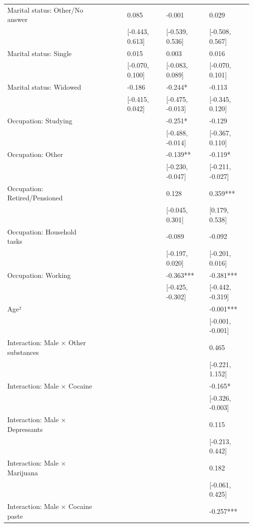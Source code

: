 \documentclass[
  spanish,
  10pt,
]{article}
\begin{document}
\begin{table}[H]
{\begin{tabular}[t]{llllllll}
Marital status: Other/No answer &  &  &  &  & 0.085 & -0.001 & 0.029\\
 &  &  &  &  & {}[-0.443, 0.613] & {}[-0.539, 0.536] & {}[-0.508, 0.567]\\
Marital status: Single &  &  &  &  & 0.015 & 0.003 & 0.016\\
 &  &  &  &  & {}[-0.070, 0.100] & {}[-0.083, 0.089] & {}[-0.070, 0.101]\\
Marital status: Widowed &  &  &  &  & -0.186 & -0.244* & -0.113\\
 &  &  &  &  & {}[-0.415, 0.042] & {}[-0.475, -0.013] & {}[-0.345, 0.120]\\
Occupation: Studying &  &  &  &  &  & -0.251* & -0.129\\
 &  &  &  &  &  & {}[-0.488, -0.014] & {}[-0.367, 0.110]\\
Occupation: Other &  &  &  &  &  & -0.139** & -0.119*\\
 &  &  &  &  &  & {}[-0.230, -0.047] & {}[-0.211, -0.027]\\
Occupation: Retired/Pensioned &  &  &  &  &  & 0.128 & 0.359***\\
 &  &  &  &  &  & {}[-0.045, 0.301] & {}[0.179, 0.538]\\
Occupation: Household tasks &  &  &  &  &  & -0.089 & -0.092\\
 &  &  &  &  &  & {}[-0.197, 0.020] & {}[-0.201, 0.016]\\
Occupation: Working &  &  &  &  &  & -0.363*** & -0.381***\\
 &  &  &  &  &  & {}[-0.425, -0.302] & {}[-0.442, -0.319]\\
Age² &  &  &  &  &  &  & -0.001***\\
 &  &  &  &  &  &  & {}[-0.001, -0.001]\\
Interaction: Male × Other substances &  &  &  &  &  &  & 0.465\\
 &  &  &  &  &  &  & {}[-0.221, 1.152]\\
Interaction: Male × Cocaine &  &  &  &  &  &  & -0.165*\\
 &  &  &  &  &  &  & {}[-0.326, -0.003]\\
Interaction: Male × Depressants &  &  &  &  &  &  & 0.115\\
 &  &  &  &  &  &  & {}[-0.213, 0.442]\\
Interaction: Male × Marijuana &  &  &  &  &  &  & 0.182\\
 &  &  &  &  &  &  & {}[-0.061, 0.425]\\
Interaction: Male × Cocaine paste &  &  &  &  &  &  & -0.257***\\

\end{tabular}}
\end{table}
\end{document}
